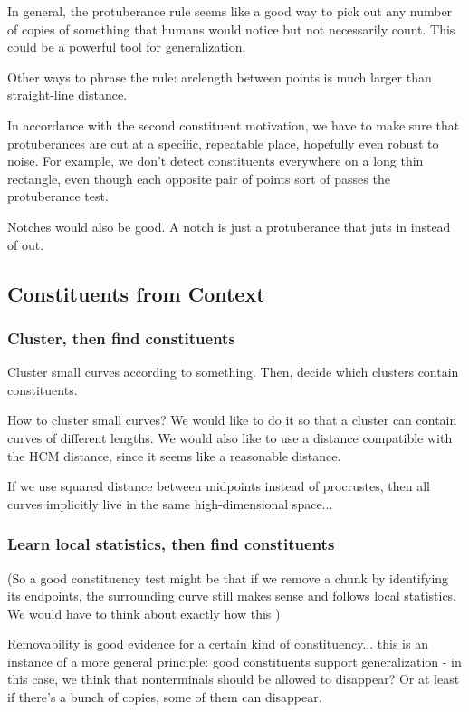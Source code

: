 \documentclass{article}
\begin{document}
In general, the protuberance rule seems like a good way to pick out any
number of copies of something that humans would notice but not
necessarily count. This could be a powerful tool for generalization.

Other ways to phrase the rule: arclength between points is much larger
than straight-line distance.

In accordance with the second constituent motivation, we have to make
sure that protuberances are cut at a specific, repeatable place,
hopefully even robust to noise. For example, we don't detect
constituents everywhere on a long thin rectangle, even though each
opposite pair of points sort of passes the protuberance test.

Notches would also be good. A notch is just a protuberance that juts in
instead of out.

\subsection{Constituents from Context}

\subsubsection{Cluster, then find constituents}
Cluster small curves according to something. Then, decide which
clusters contain constituents.

How to cluster small curves? We would like to do it so that a cluster
can contain curves of different lengths. We would also like to use a
distance compatible with the HCM distance, since it seems like a
reasonable distance.

If we use squared distance between midpoints instead of procrustes,
then all curves implicitly live in the same high-dimensional space...

\subsubsection{Learn local statistics, then find constituents}
(So a good constituency test might be that if we
remove a chunk by identifying its endpoints, the surrounding curve
still makes sense and follows local statistics. We would have to think
about exactly how this ) 

Removability is good evidence for a certain kind of constituency...
this is an instance of a more general principle: good constituents
support generalization - in this case, we think that nonterminals
should be allowed to disappear? Or at least if there's a bunch of
copies, some of them can disappear. 
\end{document}

